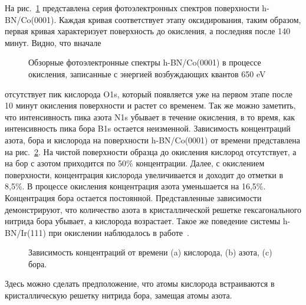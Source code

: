 На рис.~\ref{pic:Surveys} представлена серия фотоэлектронных спектров поверхности h-BN/Co(0001).
Каждая кривая соответствует этапу оксидирования, таким образом, первая кривая характеризует
поверхность до окисления, а последняя после 140 минут. Видно, что вначале
\begin{figure}[!ht]
\caption{Обзорные фотоэлектронные спектры h-BN/Co(0001) в процессе окисления, записанные с энергией
возбуждающих квантов 650 eV}
\label{pic:Surveys}
\end{figure}
отсутствует пик кислорода O1s, который появляется уже на первом этапе после 10 минут 
окисления поверхности и растет со временем. Так же можно заметить, что интенсивность
пика азота N1s убывает в течение окисления, в то время, как интенсивность пика бора
B1s остается неизменной. Зависимость концентраций азота, бора и кислорода на поверхности
h-BN/Co(0001) от времени представлена на рис.~\ref{pic:B_N_O_tot_percent}. 
На чистой поверхности образца до окисления кислород отсутствует, а на бор с азотом приходится
по 50\% концентрации. Далее, с окислением поверхности, концентрация кислорода увеличивается
и доходит до отметки в 8,5\%. В процессе окисления концентрация азота уменьшается на 16,5\%.
Концентрация бора остается постоянной. Представленные зависимости демонстрируют, что количество 
азота в кристаллической решетке гексагонального нитрида бора убывает, а кислорода возрастает.
Такое же поведение системы h-BN/Ir(111) при окислении наблюдалось в работе~\cite{Simonov2012_h-BN/Ir_Oxydation}. 
\begin{figure}[!ht]
\caption{Зависимость концентраций от времени (a) кислорода, (b) азота, (c) бора.}
\label{pic:B_N_O_tot_percent}
\end{figure}
Здесь можно сделать предположение, что атомы кислорода встраиваются в кристаллическую решетку
нитрида бора, замещая атомы азота.


